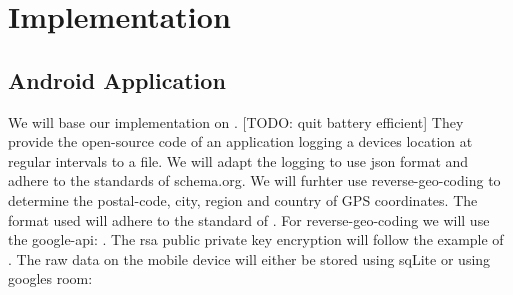 \section{Implementation}
\subsection{Android Application}
We will base our implementation on \cite{gpsLogger}. [TODO: quit battery efficient] They provide the open-source code of an application logging a devices location at regular intervals to a file. We will adapt the logging to use json format and adhere to the standards of schema.org. We will furhter use reverse-geo-coding to determine the postal-code, city, region and country of GPS coordinates. The format used will adhere to the standard of \cite{schemaOrg}. For reverse-geo-coding we will use the google-api: \cite{googleApiReverseGeo}. The rsa public private key encryption will follow the example of \cite{rsa}. The raw data on the mobile device will either be stored using sqLite or using googles room: %